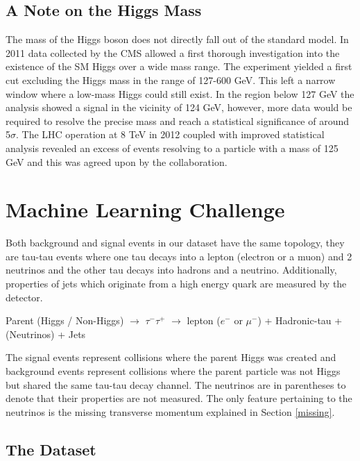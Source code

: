 \documentclass[final,3p,times,twocolumn]{elsarticle}
\begin{document}
\subsection{A Note on the Higgs Mass}

The mass of the Higgs boson does not directly fall out of the standard model. In 2011 data collected by the CMS allowed a first thorough investigation into the existence of the SM Higgs over a wide mass range. The experiment yielded a first cut excluding the Higgs mass in the range of 127-600 GeV. This left a narrow window where a low-mass Higgs could still exist. In the region below 127 GeV the analysis showed a signal in the vicinity of 124 GeV, however, more data would be required to resolve the precise mass and reach a statistical significance of around 5$\sigma$. The LHC operation at 8 TeV in 2012 coupled with improved statistical analysis revealed an excess of events resolving to a particle with a mass of 125 GeV and this was agreed upon by the collaboration. 

\section{Machine Learning Challenge}
\label{MLC}
Both background and signal events in our dataset have the same topology,  they are tau-tau events where one tau decays into a lepton (electron or a muon) and 2 neutrinos and the other tau decays into hadrons and a neutrino. Additionally, properties of jets which originate from a high energy quark are measured by the detector.

Parent (Higgs / Non-Higgs) $\rightarrow$ $\tau^{-}\tau^{+}$ $\rightarrow$ lepton ($e^{-}$ or $\mu^{-}$) + Hadronic-tau + (Neutrinos) + Jets
 
The signal events represent collisions where the parent Higgs was created and background events represent collisions where the parent particle was not Higgs but shared the same tau-tau decay channel. The neutrinos are in parentheses to denote that their properties are not measured. The only feature pertaining to the neutrinos is the missing transverse momentum explained in Section \ref{missing}.

\subsection{The Dataset}
\end{document}
